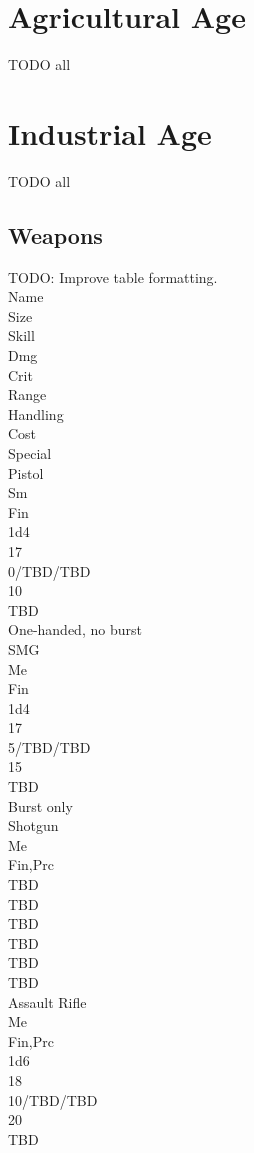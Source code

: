 \documentclass[letterpaper,titlepage,openany,twocolumn]{book}
\begin{document}
\chapter{Agricultural Age}
TODO all\\

\chapter{Industrial Age}
TODO all\\

\section{Weapons}
TODO: Improve table formatting.\\

Name\\
Size\\
Skill\\
Dmg\\
Crit\\
Range\\
Handling\\
Cost\\
Special\\
Pistol\\
Sm\\
Fin\\
1d4\\
17\\
0/TBD/TBD\\
10\\
TBD\\
One-handed, no burst\\
SMG\\
Me\\
Fin\\
1d4\\
17\\
5/TBD/TBD\\
15\\
TBD\\
Burst only\\
Shotgun\\
Me\\
Fin,Prc\\
TBD\\
TBD\\
TBD\\
TBD\\
TBD\\
TBD\\
Assault Rifle\\
Me\\
Fin,Prc\\
1d6\\
18\\
10/TBD/TBD\\
20\\
TBD\\
\end{document}
